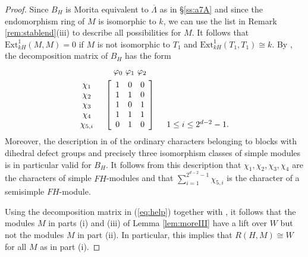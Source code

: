 \documentclass{amsart}
\theoremstyle{plain}
\theoremstyle{definition}
\theoremstyle{remark}
\begin{document}
\begin{proof}
Since $B_H$ is Morita equivalent to $\overline{\Lambda}$ as in \S\ref{ss:a7A} and since the 
endomorphism ring of $M$ is isomorphic to $k$, we can use the list in Remark \ref{rem:stablend}(iii) 
to describe all possibilities for $M$.
It follows that
$\mathrm{Ext}^1_{kH}(M,M)=0$ if $M$ is not isomorphic to $T_1$ and 
$\mathrm{Ext}^1_{kH}(T_1,T_1)\cong k$. 
By \cite[p. 295]{erd}, the decomposition matrix of $B_H$ has the form
\begin{equation}
\label{eq:help}
\begin{array}{ccc}
&\begin{array}{c@{}c@{}c}\varphi_0\,&\,\varphi_1\,&\,\varphi_2\end{array}\\[1ex]
\begin{array}{c}\chi_1\\ \chi_2\\ \chi_3 \\ \chi_4\\  \chi_{5,i}\end{array} &
\left[\begin{array}{ccc}1&0&0\\1&1&0\\1&0&1\\1&1&1\\0&1&0\end{array}\right]
&\begin{array}{c}\\ \\ \\ \\1\le i\le 2^{d-2}-1.\end{array}
\end{array}
\end{equation}
Moreover, the description in \cite[\S3.4]{3sim} of the ordinary characters belonging to blocks with dihedral defect 
groups and precisely three isomorphism classes of simple modules is in particular valid for $B_H$.
It follows from this description that $\chi_1,\chi_2,\chi_3,\chi_4$ are the characters of simple $FH$-modules
and that $\sum_{i=1}^{2^{d-2}-1}\chi_{5,i}$ is the character of a semisimple $FH$-module. 

Using the decomposition matrix in (\ref{eq:help}) together with \cite[Prop. (23.7)]{CR}, it
follows that the modules $M$ in parts (i) and (iii) of
Lemma \ref{lem:moreIII} have a lift over $W$ but not the modules $M$ in part (ii). In particular, this 
implies that $R(H,M)\cong W$ for all $M$ as in part (i).


\end{proof}
\end{document}
